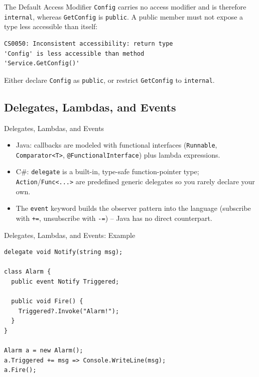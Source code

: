 \begin{solutionframe}{The Default Access Modifier}
  \texttt{Config} carries no access modifier and is therefore
  \texttt{internal}, whereas \texttt{GetConfig} is \texttt{public}. A public
  member must not expose a type less accessible than itself:
  \vspace{1ex}

  \begin{lstlisting}[language={},basicstyle=\scriptsize\ttfamily]
CS0050: Inconsistent accessibility: return type
'Config' is less accessible than method
'Service.GetConfig()'
  \end{lstlisting}
  Either declare \texttt{Config} as \texttt{public}, or restrict
  \texttt{GetConfig} to \texttt{internal}.
  \vspace{4ex}

\end{solutionframe}

\subsection{Delegates, Lambdas, and Events}

\begin{frame}{Delegates, Lambdas, and Events}
  \begin{itemize}
    \item Java: callbacks are modeled with functional interfaces
      (\texttt{Runnable}, \texttt{Comparator<T>}, \texttt{@FunctionalInterface})
      plus lambda expressions.
    \item C\#: \texttt{delegate} is a built-in, type-safe function-pointer
      type; \texttt{Action}/\texttt{Func<...>} are predefined generic
      delegates so you rarely declare your own.
    \item The \texttt{event} keyword builds the observer pattern into the
      language (subscribe with \texttt{+=}, unsubscribe with \texttt{-=}) --
      Java has no direct counterpart.
  \end{itemize}
\end{frame}

\begin{frame}[fragile]{Delegates, Lambdas, and Events: Example}
  \begin{lstlisting}
delegate void Notify(string msg);

class Alarm {
  public event Notify Triggered;

  public void Fire() {
    Triggered?.Invoke("Alarm!");
  }
}

Alarm a = new Alarm();
a.Triggered += msg => Console.WriteLine(msg);
a.Fire();
  \end{lstlisting}
\end{frame}

